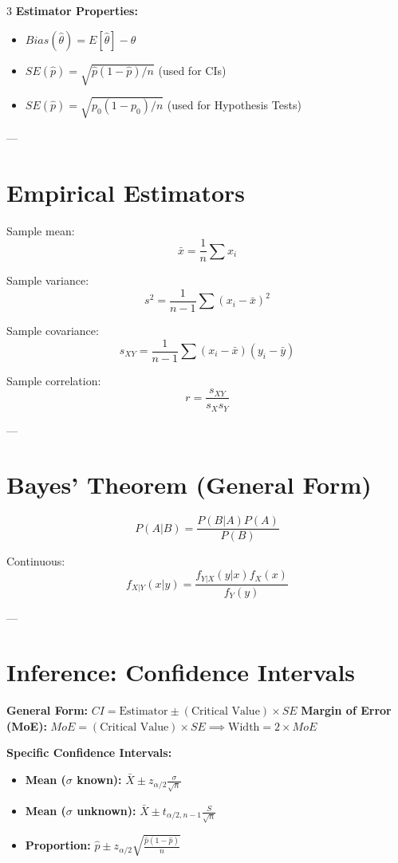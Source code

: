 \documentclass[10pt]{article}
\begin{document}
\begin{multicols}{3}
\textbf{Estimator Properties:}
\begin{itemize}
    \item $Bias(\hat{\theta}) = E[\hat{\theta}] - \theta$
    \item $SE(\hat{p}) = \sqrt{\hat{p}(1-\hat{p})/n}$ (used for CIs)
    \item $SE(\hat{p}) = \sqrt{p_0(1-p_0)/n}$ (used for Hypothesis Tests)
\end{itemize}

---

\section*{Empirical Estimators}

Sample mean:
\[
\bar x=\frac{1}{n}\sum x_i
\]

Sample variance:
\[
s^2=\frac{1}{n-1}\sum (x_i-\bar x)^2
\]

Sample covariance:
\[
s_{XY}=\frac{1}{n-1}\sum (x_i-\bar x)(y_i-\bar y)
\]

Sample correlation:
\[
r=\frac{s_{XY}}{s_X s_Y}
\]

---

\section*{Bayes' Theorem (General Form)}

\[
P(A|B)=\frac{P(B|A)P(A)}{P(B)}
\]

Continuous:
\[
f_{X|Y}(x|y)=\frac{f_{Y|X}(y|x)f_X(x)}{f_Y(y)}
\]

---

\section*{Inference: Confidence Intervals}
\textbf{General Form:} $CI = \text{Estimator} \pm (\text{Critical Value}) \times SE$
\textbf{Margin of Error (MoE):} $MoE = (\text{Critical Value}) \times SE \implies \text{Width} = 2 \times MoE$

\textbf{Specific Confidence Intervals:}
\begin{itemize}
    \item \textbf{Mean ($\sigma$ known):} $\bar{X} \pm z_{\alpha/2} \frac{\sigma}{\sqrt{n}}$
    \item \textbf{Mean ($\sigma$ unknown):} $\bar{X} \pm t_{\alpha/2, n-1} \frac{S}{\sqrt{n}}$
    \item \textbf{Proportion:} $\hat{p} \pm z_{\alpha/2} \sqrt{\frac{\hat{p}(1-\hat{p})}{n}}$
\end{itemize}


\end{multicols}
\end{document}
